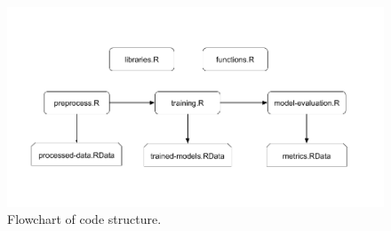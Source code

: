 \documentclass[12pt,]{article}
\begin{document}
\begin{figure}[H]

{\centering \includegraphics[width=1\linewidth]{images/r-code-chart} 

}

\caption{\label{fig:r-code-chart}Flowchart of code structure.}\label{fig:unnamed-chunk-20}
\end{figure}

\newpage


\end{document}
